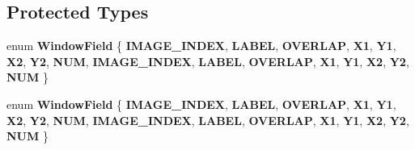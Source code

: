 \subsection*{Protected Types}
\begin{DoxyCompactItemize}
\item 
\mbox{\label{classcaffe_1_1_window_data_layer_a9ca81b56644734daf53ea5ac8ad5ef07}} 
enum {\bfseries Window\+Field} \{ \newline
{\bfseries I\+M\+A\+G\+E\+\_\+\+I\+N\+D\+EX}, 
{\bfseries L\+A\+B\+EL}, 
{\bfseries O\+V\+E\+R\+L\+AP}, 
{\bfseries X1}, 
\newline
{\bfseries Y1}, 
{\bfseries X2}, 
{\bfseries Y2}, 
{\bfseries N\+UM}, 
\newline
{\bfseries I\+M\+A\+G\+E\+\_\+\+I\+N\+D\+EX}, 
{\bfseries L\+A\+B\+EL}, 
{\bfseries O\+V\+E\+R\+L\+AP}, 
{\bfseries X1}, 
\newline
{\bfseries Y1}, 
{\bfseries X2}, 
{\bfseries Y2}, 
{\bfseries N\+UM}
 \}
\item 
\mbox{\label{classcaffe_1_1_window_data_layer_a9ca81b56644734daf53ea5ac8ad5ef07}} 
enum {\bfseries Window\+Field} \{ \newline
{\bfseries I\+M\+A\+G\+E\+\_\+\+I\+N\+D\+EX}, 
{\bfseries L\+A\+B\+EL}, 
{\bfseries O\+V\+E\+R\+L\+AP}, 
{\bfseries X1}, 
\newline
{\bfseries Y1}, 
{\bfseries X2}, 
{\bfseries Y2}, 
{\bfseries N\+UM}, 
\newline
{\bfseries I\+M\+A\+G\+E\+\_\+\+I\+N\+D\+EX}, 
{\bfseries L\+A\+B\+EL}, 
{\bfseries O\+V\+E\+R\+L\+AP}, 
{\bfseries X1}, 
\newline
{\bfseries Y1}, 
{\bfseries X2}, 
{\bfseries Y2}, 
{\bfseries N\+UM}
 \}
\end{DoxyCompactItemize}
